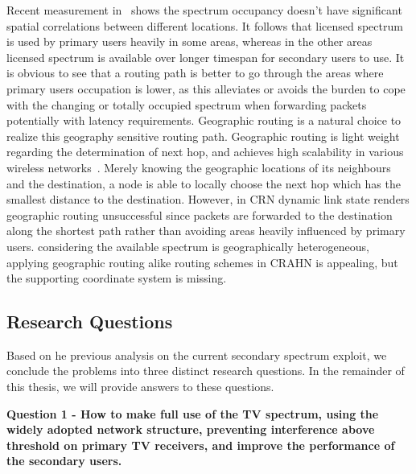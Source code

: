 Recent measurement in~\cite{measurement_Palaios14} shows the spectrum occupancy doesn't have significant spatial correlations between different locations.
It follows that licensed spectrum is used by primary users heavily in some areas, whereas in the other areas licensed spectrum is available over longer timespan for secondary users to use.
It is obvious to see that a routing path is better to go through the areas where primary users occupation is lower, as this alleviates or avoids the burden to cope with the changing or totally occupied spectrum when forwarding packets potentially with latency requirements.
Geographic routing is a natural choice to realize this geography sensitive routing path.
Geographic routing is light weight regarding the determination of next hop, and achieves high scalability in various wireless networks~\cite{geoRouing-qos-2009}. %
Merely knowing the geographic locations of its neighbours and the destination, a node is able to locally choose the next hop which has the smallest distance to the destination.
However, in CRN dynamic link state renders geographic routing unsuccessful since packets are forwarded to the destination along the shortest path rather than avoiding areas heavily influenced by primary users.
considering the available spectrum is geographically heterogeneous, applying geographic routing alike routing schemes in CRAHN is appealing, but the supporting coordinate system is missing.





\subsection{Research Questions}
Based on he previous analysis on the current secondary spectrum exploit, we conclude the problems into three distinct research questions.
In the remainder of this thesis, we will provide answers to these questions.

\textbf{Question 1 - How to make full use of the TV spectrum, using the widely adopted network structure, preventing interference above threshold on primary TV receivers, and improve the performance of the secondary users.}

